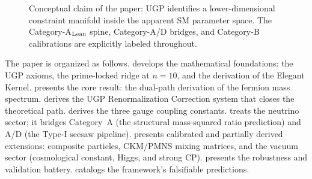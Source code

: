 \documentclass[11pt]{article}
\theoremstyle{remark}
\begin{document}
\begin{figure}[H]
\centering
{}
\caption{Conceptual claim of the paper: UGP identifies a lower-dimensional constraint manifold inside the apparent SM parameter space.  The Category-A$_{\rm Lean}$ spine, Category-A/D bridges, and Category-B calibrations are explicitly labeled throughout.}
\label{fig:constraint_manifold_schematic}
\end{figure}

The paper is organized as follows.
 develops the mathematical foundations: the UGP axioms, the prime-locked ridge at $n{=}10$, and the derivation of the Elegant Kernel.
 presents the core result: the dual-path derivation of the fermion mass spectrum.
 derives the UGP Renormalization Correction system that closes the theoretical path.
 derives the three gauge coupling constants.
 treats the neutrino sector; it bridges Category~A (the structural mass-squared ratio prediction) and A/D (the Type-I seesaw pipeline).
 presents calibrated and partially derived extensions: composite particles, CKM/PMNS mixing matrices, and the vacuum sector (cosmological constant, Higgs, and strong CP).
 presents the robustness and validation battery.
 catalogs the framework's falsifiable predictions.
\end{document}
